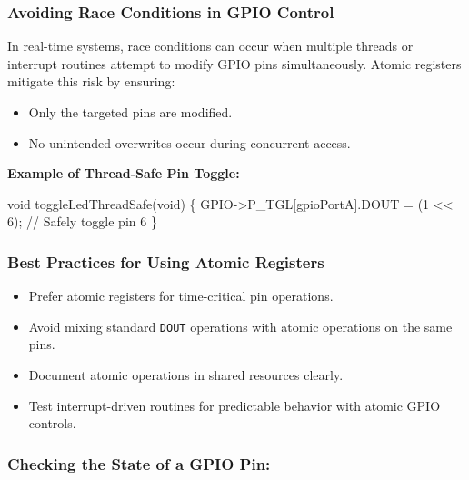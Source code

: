 \documentclass[
  9pt,
  letterpaper,
  abstract,
  titlepage]{scrbook}
\newenvironment{Shaded}{\begin{snugshade}}{\end{snugshade}}
\newcommand{\CommentTok}[1]{\textcolor[rgb]{0.37,0.37,0.37}{#1}}
\newcommand{\DataTypeTok}[1]{\textcolor[rgb]{0.68,0.00,0.00}{#1}}
\newcommand{\DecValTok}[1]{\textcolor[rgb]{0.68,0.00,0.00}{#1}}
\newcommand{\NormalTok}[1]{\textcolor[rgb]{0.00,0.23,0.31}{#1}}
\newcommand{\OperatorTok}[1]{\textcolor[rgb]{0.37,0.37,0.37}{#1}}
\begin{document}
\subsubsection{Avoiding Race Conditions in GPIO
Control}\label{avoiding-race-conditions-in-gpio-control}

In real-time systems, race conditions can occur when multiple threads or
interrupt routines attempt to modify GPIO pins simultaneously. Atomic
registers mitigate this risk by ensuring:

\begin{itemize}
\item
  Only the targeted pins are modified.
\item
  No unintended overwrites occur during concurrent access.
\end{itemize}

\textbf{Example of Thread-Safe Pin Toggle:}

\begin{Shaded}
\begin{Highlighting}[]
\DataTypeTok{void}\NormalTok{ toggleLedThreadSafe}\OperatorTok{(}\DataTypeTok{void}\OperatorTok{)} \OperatorTok{\{}
\NormalTok{    GPIO}\OperatorTok{{-}\textgreater{}}\NormalTok{P\_TGL}\OperatorTok{[}\NormalTok{gpioPortA}\OperatorTok{].}\NormalTok{DOUT }\OperatorTok{=} \OperatorTok{(}\DecValTok{1} \OperatorTok{\textless{}\textless{}} \DecValTok{6}\OperatorTok{);} \CommentTok{// Safely toggle pin 6}
\OperatorTok{\}}
\end{Highlighting}
\end{Shaded}

\subsubsection{Best Practices for Using Atomic
Registers}\label{best-practices-for-using-atomic-registers}

\begin{itemize}
\item
  Prefer atomic registers for time-critical pin operations.
\item
  Avoid mixing standard \texttt{DOUT} operations with atomic operations
  on the same pins.
\item
  Document atomic operations in shared resources clearly.
\item
  Test interrupt-driven routines for predictable behavior with atomic
  GPIO controls.
\end{itemize}

\subsubsection{Checking the State of a GPIO
Pin:}\label{checking-the-state-of-a-gpio-pin}
\end{document}
